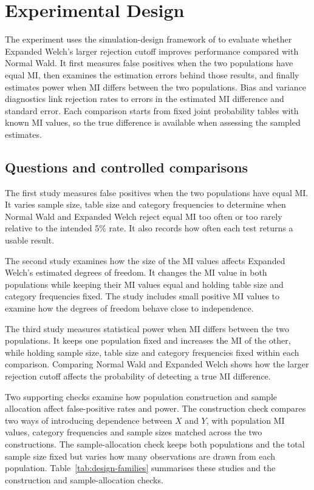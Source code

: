 \chapter{Experimental Design}
\label{chap:design}

The experiment uses the simulation-design framework of \citet{morris2019}
to evaluate whether Expanded Welch's larger rejection cutoff improves
performance compared with Normal Wald. It first measures false
positives when the two populations have equal MI, then examines the
estimation errors behind those results,
and finally estimates power when MI differs between the two populations.
Bias and variance diagnostics
link rejection rates to errors in the estimated MI difference and standard
error. Each comparison starts from fixed joint probability tables with
known MI values, so the
true difference is available when assessing the sampled estimates.

\section{Questions and controlled comparisons}

The first study measures false positives when the two populations have
equal MI. It varies sample size, table size and category frequencies to
determine when Normal Wald and Expanded Welch reject equal MI too often
or too rarely relative to the intended 5\% rate. It also records how often
each test returns a usable result.

The second study examines how the size of the MI values affects Expanded
Welch's estimated degrees of freedom. It changes the MI value in both
populations while keeping their MI values equal and holding table size
and category frequencies fixed. The study includes small positive MI values
to examine how the degrees of freedom behave close to independence.

The third study measures statistical power when MI differs between the
two populations. It keeps one population fixed and increases the MI of the
other, while holding sample size, table size and category frequencies fixed
within each comparison. Comparing Normal Wald and Expanded Welch shows
how the larger rejection cutoff affects the probability of detecting a
true MI difference.

Two supporting checks examine how population construction and sample
allocation affect false-positive rates and power. The construction check
compares two ways of introducing dependence between \(X\) and \(Y\), with
population MI values, category frequencies and sample sizes matched across
the two constructions. The sample-allocation check keeps both populations
and the total sample size fixed but varies how many observations are drawn
from each population. Table~\ref{tab:design-families} summarises these
studies and the construction and sample-allocation checks.

